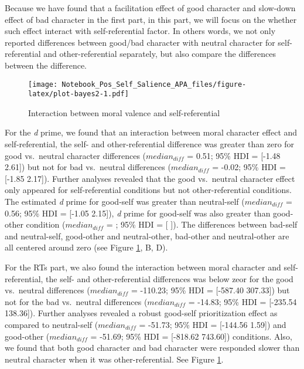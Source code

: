 \documentclass[
  english,
  man]{apa6}
\begin{document}
Because we have found that a facilitation effect of good character and slow-down effect of bad character in the first part, in this part, we will focus on the whether such effect interact with self-referential factor. In others words, we not only reported differences between good/bad character with neutral character for self-referential and other-referential separately, but also compare the differences between the difference.

\begin{figure}
\centering
\texttt{[image: Notebook\_Pos\_Self\_Salience\_APA\_files/figure-latex/plot-bayes2-1.pdf]}
\caption{\label{fig:plot-bayes2}Interaction between moral valence and self-referential}
\end{figure}

For the \emph{d} prime, we found that an interaction between moral character effect and self-referential, the self- and other-referential difference was greater than zero for good vs.~neutral character differences (\(median_{diff}\) = 0.51; 95\% HDI = {[}-1.48 2.61{]}) but not for bad vs.~neutral differences (\(median_{diff}\) = -0.02; 95\% HDI = {[}-1.85 2.17{]}). Further analyses revealed that the good vs.~neutral character effect only appeared for self-referential conditions but not other-referential conditions. The estimated \emph{d} prime for good-self was greater than neutral-self (\(median_{diff}\) = 0.56; 95\% HDI = {[}-1.05 2.15{]}), \emph{d} prime for good-self was also greater than good-other condition (\(median_{diff}\) = ; 95\% HDI = {[} {]}). The differences between bad-self and neutral-self, good-other and neutral-other, bad-other and neutral-other are all centered around zero (see Figure \ref{fig:plot-bayes2}, B, D).

For the RTs part, we also found the interaction between moral character and self-referential, the self- and other-referential differences was below zeor for the good vs.~neutral differences (\(median_{diff}\) = -110.23; 95\% HDI = {[}-587.40 307.33{]}) but not for the bad vs.~neutral differences (\(median_{diff}\) = -14.83; 95\% HDI = {[}-235.54 138.36{]}). Further analyses revealed a robust good-self prioritization effect as compared to neutral-self (\(median_{diff}\) = -51.73; 95\% HDI = {[}-144.56 1.59{]}) and good-other (\(median_{diff}\) = -51.69; 95\% HDI = {[}-818.62 743.60{]}) conditions. Also, we found that both good character and bad character were responded slower than neutral character when it was other-referential. See Figure \ref{fig:plot-bayes2}.
\end{document}
